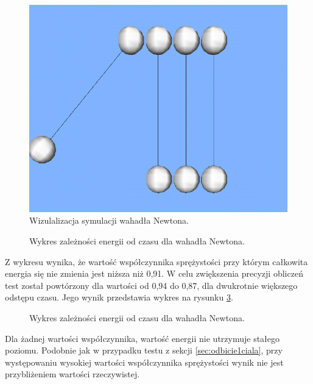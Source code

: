 \begin{figure}
\centering
\includegraphics[scale=0.5]{img/newtonPendulum.png}
\caption{Wizulalizacja symulacji wahadła Newtona.}
\label{fig:newtonPendulum}
\end{figure}

\begin{figure}
\centering

\caption{Wykres zależności energii od czasu dla wahadła Newtona.}
\label{fig:wahadloNewtona1}
\end{figure}

Z wykresu wynika, że wartość współczynnika sprężystości przy którym całkowita
energia się nie zmienia jest niższa niż 0,91. W celu zwiększenia precyzji
obliczeń test został powtórzony dla wartości od 0,94 do 0,87, dla dwukrotnie
większego odstępu czasu. Jego wynik przedstawia wykres na rysunku
\ref{fig:wahadloNewtona2}.

\begin{figure}
\centering

\caption{Wykres zależności energii od czasu dla wahadła Newtona.}
\label{fig:wahadloNewtona2}
\end{figure}

Dla żadnej wartości współczynnika, wartość energii nie utrzymuje stałego
poziomu. Podobnie jak w przypadku testu z sekcji \ref{sec:odbicie1ciala}, przy
występowaniu wysokiej wartości współczynnika sprężystości wynik nie jest
przybliżeniem wartości rzeczywistej.


